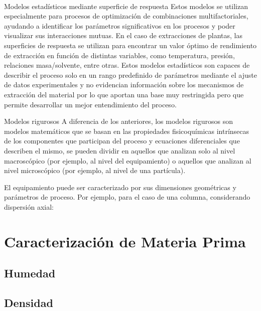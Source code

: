 \documentclass[11pt,a4paper]{article}
\begin{document}
\paragraph{}
\begin{descriptionB}
\item[Modelos estadísticos mediante superficie de respuesta]
Estos modelos se utilizan especialmente para procesos de optimización de combinaciones multifactoriales, ayudando a identificar los parámetros significativos en los procesos y poder visualizar sus interacciones mutuas. En el caso de extracciones de plantas, las superficies de respuesta se utilizan para encontrar un valor óptimo de rendimiento de extracción en función de distintas variables, como temperatura, presión, relaciones masa/solvente, entre otras. Estos modelos estadísticos son capaces de describir el proceso solo en un rango predefinido de parámetros mediante el ajuste de datos experimentales y no evidencian información sobre los mecanismos de extracción del material por lo que aportan una base muy restringida pero que permite desarrollar un mejor entendimiento del proceso.

\item[Modelos rigurosos]
A diferencia de los anteriores, los modelos rigurosos son modelos matemáticos que se basan en las propiedades fisicoquímicas intrínsecas de los componentes que participan del proceso y ecuaciones diferenciales que describen el mismo, se pueden dividir en aquellos que analizan solo al nivel macroscópico (por ejemplo, al nivel del equipamiento) o aquellos que analizan al nivel microscópico (por ejemplo, al nivel de una partícula).

El equipamiento puede ser caracterizado por sus dimensiones geométricas y parámetros de proceso. Por ejemplo, para el caso de una columna, considerando dispersión axial:

\end{descriptionB}

\section{Caracterización de Materia Prima}
\subsection{Humedad\label{humedad}}
\subsection{Densidad\label{densidad}}
\end{document}
